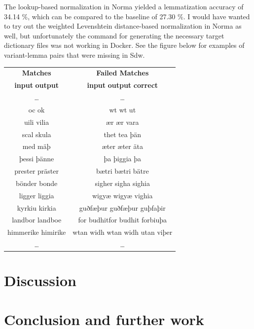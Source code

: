 \documentclass[11pt,a4paper]{article}
\begin{document}
The lookup-based normalization in Norma yielded a lemmatization accuracy of 34.14 \%, which can be compared to the baseline of 27.30 \%. I would have wanted to try out the weighted Levenshtein distance-based normalization in Norma as well, but unfortunately the command for generating the necessary target dictionary files was not working in Docker. See the figure below for examples of variant-lemma pairs that were missing in Sdw.

    \begin{table}[H]
    \centering
    \begin{tabular}{c|c}
        \textbf{Matches} & \textbf{Failed Matches} \\
        \textbf{input} \quad \textbf{output} & \textbf{input} \quad \textbf{output} \quad \textbf{correct} \\
         \ldots & \ldots \\
        oc  \quad ok & wt \quad wt \quad ut \\
        uili \quad vilia & ær \quad ær \quad vara \\
        scal \quad skula & thet \quad tea \quad þän \\
        med \quad mäþ & æter \quad æter \quad äta \\
        þessi \quad þänne & þa \quad þiggia \quad þa \\
        prester \quad präster & bætri \quad bætri \quad bätre \\
        bönder \quad bonde & sigher \quad sigha \quad sighia \\
        ligger \quad liggia & wigyæ \quad wigyæ \quad vighia\\
        kyrkiu  \quad kirkia & guðfæþur \quad guðfæþur \quad guþfaþir\\
        landbor \quad landboe &	for budhit\quad for budhit \quad forbiuþa \\
          himmerike \quad himirike & wtan widh \quad wtan widh \quad utan viþer \\
        \ldots & \ldots
    \end{tabular}
    \end{table}

\section{Discussion}



\section{Conclusion and further work}



\end{document}
